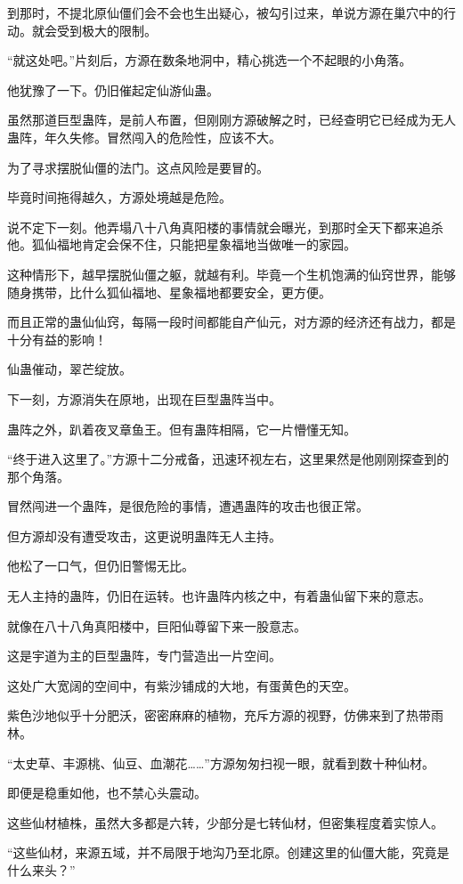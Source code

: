 \begin{this_body}
到那时，不提北原仙僵们会不会也生出疑心，被勾引过来，单说方源在巢穴中的行动。就会受到极大的限制。

“就这处吧。”片刻后，方源在数条地洞中，精心挑选一个不起眼的小角落。

他犹豫了一下。仍旧催起定仙游仙蛊。

虽然那道巨型蛊阵，是前人布置，但刚刚方源破解之时，已经查明它已经成为无人蛊阵，年久失修。冒然闯入的危险性，应该不大。

为了寻求摆脱仙僵的法门。这点风险是要冒的。

毕竟时间拖得越久，方源处境越是危险。

说不定下一刻。他弄塌八十八角真阳楼的事情就会曝光，到那时全天下都来追杀他。狐仙福地肯定会保不住，只能把星象福地当做唯一的家园。

这种情形下，越早摆脱仙僵之躯，就越有利。毕竟一个生机饱满的仙窍世界，能够随身携带，比什么狐仙福地、星象福地都要安全，更方便。

而且正常的蛊仙仙窍，每隔一段时间都能自产仙元，对方源的经济还有战力，都是十分有益的影响！

仙蛊催动，翠芒绽放。

下一刻，方源消失在原地，出现在巨型蛊阵当中。

蛊阵之外，趴着夜叉章鱼王。但有蛊阵相隔，它一片懵懂无知。

“终于进入这里了。”方源十二分戒备，迅速环视左右，这里果然是他刚刚探查到的那个角落。

冒然闯进一个蛊阵，是很危险的事情，遭遇蛊阵的攻击也很正常。

但方源却没有遭受攻击，这更说明蛊阵无人主持。

他松了一口气，但仍旧警惕无比。

无人主持的蛊阵，仍旧在运转。也许蛊阵内核之中，有着蛊仙留下来的意志。

就像在八十八角真阳楼中，巨阳仙尊留下来一股意志。

这是宇道为主的巨型蛊阵，专门营造出一片空间。

这处广大宽阔的空间中，有紫沙铺成的大地，有蛋黄色的天空。

紫色沙地似乎十分肥沃，密密麻麻的植物，充斥方源的视野，仿佛来到了热带雨林。

“太史草、丰源桃、仙豆、血潮花……”方源匆匆扫视一眼，就看到数十种仙材。

即便是稳重如他，也不禁心头震动。

这些仙材植株，虽然大多都是六转，少部分是七转仙材，但密集程度着实惊人。

“这些仙材，来源五域，并不局限于地沟乃至北原。创建这里的仙僵大能，究竟是什么来头？”


\end{this_body}
